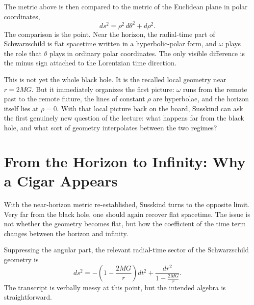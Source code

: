 The metric above is then compared to the metric of the Euclidean plane in polar coordinates,
\begin{equation}
ds^2=\rho^2\,d\theta^2+d\rho^2.
\end{equation}
The comparison is the point. Near the horizon, the radial-time part of Schwarzschild is flat spacetime written in a hyperbolic-polar form, and \(\omega\) plays the role that \(\theta\) plays in ordinary polar coordinates. The only visible difference is the minus sign attached to the Lorentzian time direction.

This is not yet the whole black hole. It is the recalled local geometry near \(r=2MG\). But it immediately organizes the first picture: \(\omega\) runs from the remote past to the remote future, the lines of constant \(\rho\) are hyperbolae, and the horizon itself lies at \(\rho=0\). With that local picture back on the board, Susskind can ask the first genuinely new question of the lecture: what happens far from the black hole, and what sort of geometry interpolates between the two regimes?

\section{From the Horizon to Infinity: Why a Cigar Appears}

With the near-horizon metric re-established, Susskind turns to the opposite limit. Very far from the black hole, one should again recover flat spacetime. The issue is not whether the geometry becomes flat, but how the coefficient of the time term changes between the horizon and infinity.

Suppressing the angular part, the relevant radial-time sector of the Schwarzschild geometry is
\begin{equation}
ds^2=-\left(1-\frac{2MG}{r}\right)dt^2+\frac{dr^2}{1-\frac{2MG}{r}}.
\end{equation}
The transcript is verbally messy at this point, but the intended algebra is straightforward.

